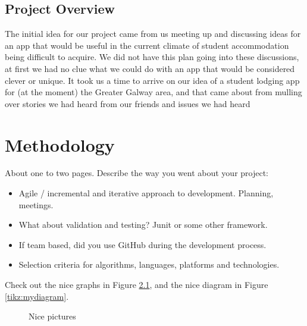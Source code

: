 \section{Project Overview}
The initial idea for our project came from us meeting up and discussing ideas for an app that would be useful in the current climate of student accommodation being difficult to acquire. We did not have this plan going into these discussions, at first we had no clue what we could do with an app that would be considered clever or unique. It took us a time to arrive on our idea of a student lodging app for (at the moment) the Greater Galway area, and that came about from mulling over stories we had heard from our friends and issues we had heard 

\chapter{Methodology}
About one to two pages.
Describe the way you went about your project:
\begin{itemize}
\item Agile / incremental and iterative approach to development. Planning, meetings.
\item What about validation and testing? Junit or some other framework.
\item If team based, did you use GitHub during the development process.
\item Selection criteria for algorithms, languages, platforms and technologies.
\end{itemize}
Check out the nice graphs in Figure \ref{tikz:graphs}, and the nice diagram in Figure \ref{tikz:mydiagram}.

\begin{figure}
  \centering
  \hspace{1.5cm}
  \caption{Nice pictures}
  \label{tikz:graphs}
\end{figure}
